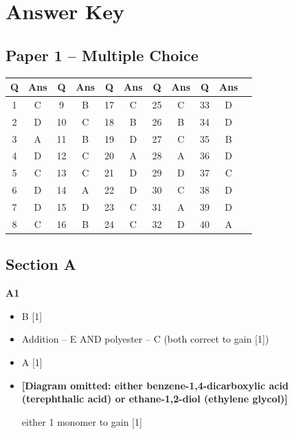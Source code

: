 \documentclass[11pt]{exam}
\begin{document}
\newpage


\section*{Answer Key}

\subsection*{Paper 1 -- Multiple Choice}

\begin{tabular}{|c|c|c|c|c|c|c|c|c|c|c|}
\hline
Q & Ans & Q & Ans & Q & Ans & Q & Ans & Q & Ans \\
\hline
1 & C & 9 & B & 17 & C & 25 & C & 33 & D \\
2 & D & 10 & C & 18 & B & 26 & B & 34 & D \\
3 & A & 11 & B & 19 & D & 27 & C & 35 & B \\
4 & D & 12 & C & 20 & A & 28 & A & 36 & D \\
5 & C & 13 & C & 21 & D & 29 & D & 37 & C \\
6 & D & 14 & A & 22 & D & 30 & C & 38 & D \\
7 & D & 15 & D & 23 & C & 31 & A & 39 & D \\
8 & C & 16 & B & 24 & C & 32 & D & 40 & A \\
\hline
\end{tabular}

\subsection*{Section A}

\textbf{A1}
\begin{itemize}
\item[(a)] B [1]
\item[(b)] Addition -- E \hfill AND \hfill polyester -- C (both correct to gain [1])
\item[(c)] A [1]
\item[(d)]

\textbf{[Diagram omitted: either benzene-1,4-dicarboxylic acid (terephthalic acid) or ethane-1,2-diol (ethylene glycol)]}

\hfill either 1 monomer to gain [1]
\end{itemize}
\end{document}
